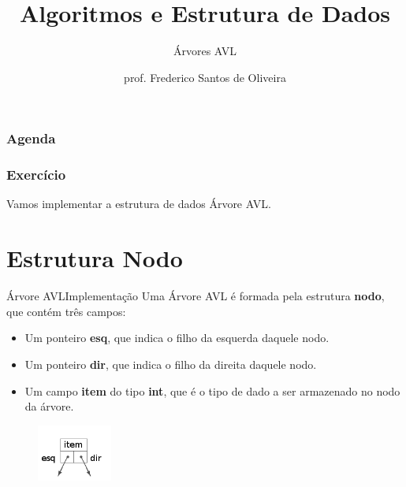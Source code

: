 \documentclass[aspectratio=169]{beamer}
\title[Aula Prática - Árvores AVL]{Algoritmos e Estrutura de Dados}
\subtitle{Árvores AVL}
\author[Frederico Santos de Oliveira]{prof. Frederico Santos de Oliveira}
\institute[UFMT]{Universidade Federal de Mato Grosso\\ Faculdade de Engenharia}
\date{}
\begin{document}

\begin{frame}[plain]
  \titlepage
\end{frame}


\begin{frame}
  \frametitle{Agenda}
  \tableofcontents
\end{frame}


\begin{frame}
\frametitle{Exercício}
Vamos implementar a estrutura de dados Árvore AVL.
\end{frame}

\section{Estrutura Nodo}

\begin{frame}{Árvore AVL}{Implementação}
Uma Árvore AVL é formada pela estrutura {\bf nodo}, que contém três campos:
\begin{itemize}
 \item Um ponteiro {\bf esq}, que indica o filho da esquerda daquele nodo.
 \item Um ponteiro {\bf dir}, que indica o filho da direita daquele nodo.
 \item Um campo {\bf item} do tipo {\bf int}, que é o tipo de dado a ser armazenado no nodo da árvore.
\end{itemize}
\begin{figure}[!h]
  \centering
  \includegraphics[width=70pt]{imagens/nodo.png}
  \label{fig_nodo}
\end{figure}
\end{frame}
\end{document}
